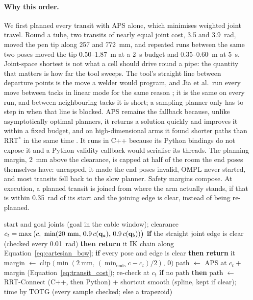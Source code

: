 \paragraph{Why this order.} We first planned every transit with APS alone, which minimises weighted joint
travel. Round a tube, two transits of nearly equal joint cost, 3.5 and 3.9~rad, moved the pen tip along
257 and 772~mm, and repeated runs between the same two poses moved the tip 0.50--1.87~m at a 2~s
budget and 0.35--0.60~m at 5~s.
Joint-space shortest is not what a cell should drive round a pipe: the quantity that matters is how far
the tool sweeps. The tool's straight line between departure points is the move a welder would program,
and Jia et al.\ run every move between tacks in linear mode for the same reason \cite{jia2025tack}; it
is the same on every run, and between neighbouring tacks it is short; a sampling planner only has to
step in when that line is blocked. APS remains the fallback because, unlike asymptotically optimal
planners, it returns a solution quickly and improves it within a fixed budget, and on high-dimensional
arms it found shorter paths than RRT$^\ast$ in the same time \cite{luna2013aps}. It runs in C++ because
its Python bindings do not expose it and a Python validity callback would serialise its threads. The
planning margin, 2~mm above the clearance, is capped at half of the room the end poses themselves have:
uncapped, it made the end poses invalid, OMPL never started, and most transits fell back to the slow
planner. Safety margins compose. At execution, a planned transit is joined from where the arm actually
stands, if that is within 0.35~rad of its start and the joining edge is clear, instead of being
re-planned.

\begin{algorithm}[htbp]
\caption{The transit cascade}
\label{alg:transit}
\begin{algorithmic}[1]
\REQUIRE start and goal joints (goal in the cable window); clearance $c_t=\max\big(c,\ \min(20~\mathrm{mm},\,0.9\,c(\vect{q}_a),\,0.9\,c(\vect{q}_b))\big)$
\STATE \textbf{if} the straight joint edge is clear (checked every 0.01~rad) \textbf{then return} it
    \STATE IK chain along Equation~\ref{eq:cartesian_bow}; \textbf{if} every pose and edge is clear \textbf{then return} it
  \ENDFOR
\ENDIF
\STATE margin $\gets\operatorname{clip}\big(\min(2~\mathrm{mm},\,(\min_{\mathrm{ends}}c-c_t)/2),\,0\big)$
\STATE path $\gets$ APS at $c_t+$ margin (Equation~\ref{eq:transit_cost}); re-check at $c_t$
\STATE \textbf{if} no path \textbf{then} path $\gets$ RRT-Connect (C++, then Python) + shortcut
\STATE smooth (spline, kept if clear); time by TOTG (every sample checked; else a trapezoid)
\end{algorithmic}
\end{algorithm}

